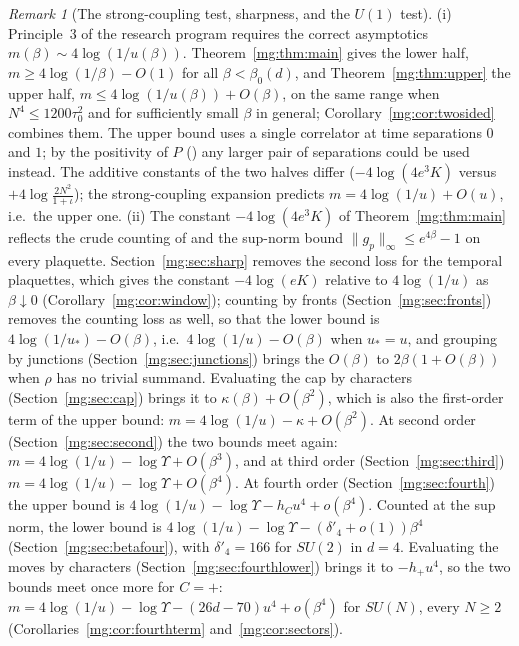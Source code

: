 \documentclass[11pt,a4paper]{article}
\theoremstyle{definition}
\theoremstyle{remark}
\newtheorem{remark}[theorem]{Remark}
\newcommand{\norm}[1]{\lVert #1\rVert}
\newcommand{\IIref}[3]{\cite[#1~`#2' (\texttt{#3})]{II}}
\begin{document}
\begin{remark}[The strong-coupling test, sharpness, and the $U(1)$ test]\label{mg:rem:tests}
(i) Principle~3 of the research program requires the correct asymptotics $m(\beta)\sim4\log(1/u(\beta))$. Theorem~\ref{mg:thm:main}
gives the lower half, $m\ge4\log(1/\beta)-O(1)$ for all $\beta<\beta_0(d)$, and Theorem~\ref{mg:thm:upper} the upper half,
$m\le4\log(1/u(\beta))+O(\beta)$, on the same range when $N^4\le1200\tau_0^2$ and for sufficiently small $\beta$ in general;
Corollary~\ref{mg:cor:twosided} combines them. The upper bound uses a
single correlator at time separations $0$ and $1$; by the positivity of $P$ (\IIref{Remark}{Consequences for the numerics}{iv:rem:numerics})
any larger pair of separations could be used instead. The additive constants of the two halves differ
($-4\log(4e^3K)$ versus $+4\log\frac{2N^2}{1+\iota}$); the strong-coupling expansion predicts $m=4\log(1/u)+O(u)$, i.e.\ the upper one. (ii) The constant $-4\log(4e^3K)$ of Theorem~\ref{mg:thm:main} reflects the crude counting of \cite{III} and the sup-norm bound
$\norm{g_p}_\infty\le e^{4\beta}-1$ on every plaquette. Section~\ref{mg:sec:sharp} removes the second loss for the temporal plaquettes, which
gives the constant $-4\log(eK)$ relative to $4\log(1/u)$ as $\beta\downarrow0$ (Corollary~\ref{mg:cor:window}); counting by fronts
(Section~\ref{mg:sec:fronts}) removes the counting loss as well, so that the lower bound is $4\log(1/u_*)-O(\beta)$, i.e.\ $4\log(1/u)-O(\beta)$
when $u_*=u$, and grouping by junctions (Section~\ref{mg:sec:junctions}) brings the $O(\beta)$ to $2\beta(1+O(\beta))$ when $\rho$ has no trivial summand.
Evaluating the cap by characters (Section~\ref{mg:sec:cap}) brings it to $\kappa(\beta)+O(\beta^2)$, which is also the first-order term of the upper bound:
$m=4\log(1/u)-\kappa+O(\beta^2)$. At second order (Section~\ref{mg:sec:second}) the two bounds meet again: $m=4\log(1/u)-\log\Upsilon+O(\beta^3)$, and at third
order (Section~\ref{mg:sec:third}) $m=4\log(1/u)-\log\Upsilon+O(\beta^4)$. At fourth order (Section~\ref{mg:sec:fourth}) the upper bound is
$4\log(1/u)-\log\Upsilon-h_Cu^4+o(\beta^4)$. Counted at the sup norm, the lower bound is $4\log(1/u)-\log\Upsilon-(\delta'_4+o(1))\beta^4$ (Section~\ref{mg:sec:betafour}), with
$\delta'_4=166$ for $SU(2)$ in $d=4$. Evaluating the moves by characters (Section~\ref{mg:sec:fourthlower}) brings it to $-h_+u^4$, so the two bounds meet once more for
$C=+$: $m=4\log(1/u)-\log\Upsilon-(26d-70)u^4+o(\beta^4)$ for $SU(N)$, every $N\ge2$ (Corollaries~\ref{mg:cor:fourthterm} and~\ref{mg:cor:sectors}).

\end{remark}
\end{document}
